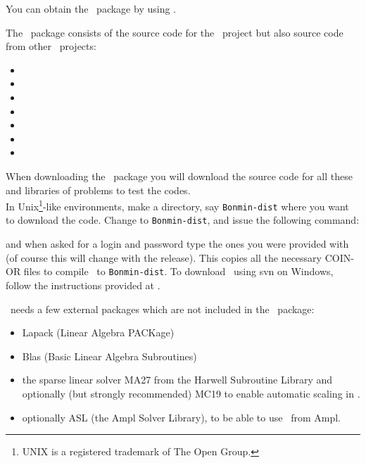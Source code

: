 \StartPageSummary
{}
\EndPageSummary
\NavigationPanel





You can obtain the \Bonmin\ package by using
.

The \Bonmin\ package consists of the source code for the \Bonmin\
project but also source code from other \COINOR\ projects:
\begin{itemize}
\item \BuildTools
\item \Cbc
\item \Cgl
\item \Clp
\item \CoinUtils
\item \Ipopt
\item \Osi
\end{itemize}

When downloading the \Bonmin\ package you will download the source code for all these and
libraries of problems to test the codes.\\

In Unix\footnote{UNIX is a registered trademark of The Open
Group.}-like environments, make a directory, say {\tt Bonmin-dist} where you want to
download the code. Change to {\tt Bonmin-dist}, and issue the following
command:
\break


\noindent and when asked for a login and password type the ones you
were provided with (of course this will change with the release).
This copies all the necessary COIN-OR files to compile \Bonmin\ to
{\tt Bonmin-dist}. To download \Bonmin\ using svn on Windows,
follow the instructions provided at
.

\Bonmin\ needs a few external packages which are not included in the \Bonmin\ package:
\begin{itemize}
\item Lapack (Linear Algebra PACKage)
\item Blas (Basic Linear Algebra Subroutines)
\item the sparse linear solver MA27 from the Harwell Subroutine Library and optionally (but strongly recommended) MC19 to enable automatic scaling in \Ipopt.
\item optionally ASL (the Ampl Solver Library), to be able to use \Bonmin\ from Ampl.
\end{itemize}

